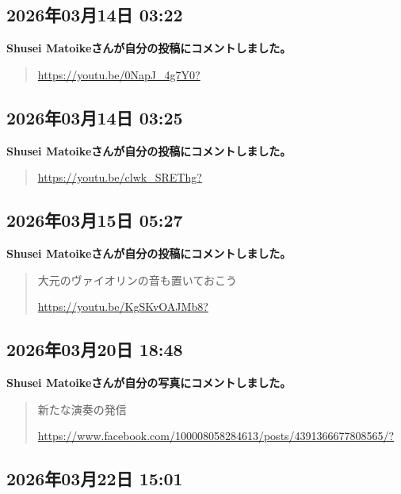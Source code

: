 \subsection*{2026年03月14日 03:22}

\textbf{Shusei Matoikeさんが自分の投稿にコメントしました。}

\begin{quote}
\url{https://youtu.be/0NapJ_4g7Y0?}
\end{quote}

\subsection*{2026年03月14日 03:25}

\textbf{Shusei Matoikeさんが自分の投稿にコメントしました。}

\begin{quote}
\url{https://youtu.be/clwk_SREThg?}
\end{quote}

\subsection*{2026年03月15日 05:27}

\textbf{Shusei Matoikeさんが自分の投稿にコメントしました。}

\begin{quote}
大元のヴァイオリンの音も置いておこう

\url{https://youtu.be/KgSKvOAJMb8?}
\end{quote}

\subsection*{2026年03月20日 18:48}

\textbf{Shusei Matoikeさんが自分の写真にコメントしました。}

\begin{quote}
新たな演奏の発信

\url{https://www.facebook.com/100008058284613/posts/4391366677808565/?}
\end{quote}

\subsection*{2026年03月22日 15:01}

